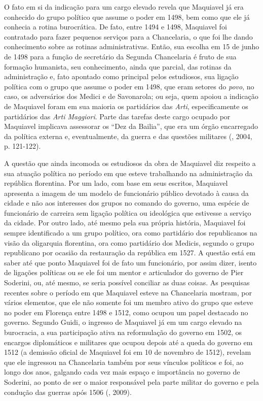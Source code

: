 O fato em si da indicação para um cargo elevado revela que Maquiavel já
era conhecido do grupo político que assume o poder em 1498, bem como que
ele já conhecia a rotina burocrática. De fato, entre 1494 e 1498,
Maquiavel foi contratado para fazer pequenos serviços para a
Chancelaria, o que foi lhe dando conhecimento sobre as rotinas
administrativas. Então, sua escolha em 15 de junho de 1498 para a função
de secretário da Segunda Chancelaria é fruto de sua formação humanista,
seu conhecimento, ainda que parcial, das rotinas da administração e,
fato apontado como principal pelos estudiosos, sua ligação política com
o grupo que assume o poder em 1498, que eram setores do \emph{povo}, no
caso, os adversários dos Medici e de Savonarola; ou seja, quem apoiou a
indicação de Maquiavel foram em sua maioria os partidários das
\emph{Arti}, especificamente os partidários das \emph{Arti Maggiori}.
Parte das tarefas deste cargo ocupado por Maquiavel implicava assessorar
os ``Dez da Bailia'', que era um órgão encarregado da política externa
e, eventualmente, da guerra e das questões militares (, 2004, p.
121-122).

A questão que ainda incomoda os estudiosos da obra de Maquiavel diz
respeito a sua atuação política no período em que esteve trabalhando na
administração da república florentina. Por um lado, com base em seus
escritos, Maquiavel apresenta a imagem de um modelo de funcionário
público devotado à causa da cidade e não aos interesses dos grupos no
comando do governo, uma espécie de funcionário de carreira sem ligação
política ou ideológica que estivesse a serviço da cidade\emph{.} Por
outro lado, até mesmo pela sua própria história, Maquiavel foi sempre
identificado a um grupo político, ora como partidário dos republicanos
na visão da oligarquia florentina, ora como partidário dos Medicis,
segundo o grupo republicano por ocasião da restauração da república em
1527. A questão está em saber até que ponto Maquiavel foi de fato um
funcionário, por assim dizer, isento de ligações políticas ou se ele foi
um mentor e articulador do governo de Pier Soderini, ou, até mesmo, se
seria possível conciliar as duas coisas. As pesquisas recentes sobre o
período em que Maquiavel esteve na Chancelaria mostram, por vários
elementos, que ele não somente foi um membro ativo do grupo que esteve
no poder em Florença entre 1498 e 1512, como ocupou um papel destacado
no governo. Segundo Guidi, o ingresso de Maquiavel já em um cargo
elevado na burocracia, a sua participação ativa na reformulação do
governo em 1502, os encargos diplomáticos e militares que ocupou depois
até a queda do governo em 1512 (a demissão oficial de Maquiavel foi em
10 de novembro de 1512), revelam que ele ingressou na Chancelaria também
por seus vínculos políticos e foi, ao longo dos anos, galgando cada vez
mais espaço e importância no governo de Soderini, ao ponto de ser o
maior responsável pela parte militar do governo e pela condução das
guerras após 1506 (, 2009).

